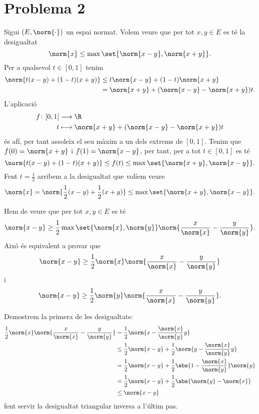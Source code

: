 \documentclass[12pt]{article}
\begin{document}
\section*{Problema 2}
Sigui \( (E, \norm{\cdot}) \) un espai normat. Volem veure que per tot \( x,y \in E \) es té
la desigualtat
\begin{equation*}
	\norm{x} \leq \max\set{\norm{x - y}, \norm{x + y}}.
\end{equation*}
Per a qualsevol \( t \in [0,1] \) tenim 
\begin{align*}
	\norm{t(x - y) + (1 - t)(x + y)} & \leq t\norm{x - y} + (1 - t)\norm{x + y} \\
																	 & = \norm{x+y} +	(\norm{x-y} - \norm{x+y})t.
\end{align*}
L'aplicació
\begin{align*}
	f \colon [0,1] & \longrightarrow \R \\
	t & \longmapsto \norm{x+y} + (\norm{x-y} - \norm{x+y})t
\end{align*}
és afí, per tant assoleix el seu màxim a un dels extrems de \( [0,1] \). Tenim que \( f(0) =
\norm{x+y} \) i \( f(1) = \norm{x -y} \), per tant, per a tot \( t \in [0,1] \) es té
\begin{equation*}
	\norm{t(x - y) + (1 - t)(x + y)} \leq f(t) \leq \max\set{\norm{x+y}, \norm{x-y}}.
\end{equation*}
Fent \( t = \frac{1}{2} \) arribem a la desigualtat que volíem veure
\begin{equation*}
	\norm{x} = \norm{\frac{1}{2}(x-y) + \frac{1}{2}(x+y)} \leq \max\set{\norm{x+y},
	\norm{x-y}}.
\end{equation*}

\parbreak

Hem de veure que per tot \( x,y \in E \) es té
\begin{equation*}
	\norm{x - y} \geq \frac{1}{2} \max\set{\norm{x}, \norm{y}} \norm{\frac{x}{\norm{x}} -
	\frac{y}{\norm{y}}}.
\end{equation*}
Aixó és equivalent a provar que 
\begin{equation*}
	\norm{x - y} \geq \frac{1}{2} \norm{x} \norm{\frac{x}{\norm{x}} -
	\frac{y}{\norm{y}}}
\end{equation*}
i 
\begin{equation*}
	\norm{x - y} \geq \frac{1}{2} \norm{y} \norm{\frac{x}{\norm{x}} -
	\frac{y}{\norm{y}}}.
\end{equation*}

Demostrem la primera de les desigualtats:
\begin{align*}
	\frac{1}{2} \norm{x} \norm{\frac{x}{\norm{x}} -	\frac{y}{\norm{y}}} 
	& = \frac{1}{2}\norm{x - \frac{\norm{x}}{\norm{y}}y} \\
	& \leq \frac{1}{2}\norm{x - y} + \frac{1}{2}\norm{y - \frac{\norm{x}}{\norm{y}}y} \\
	& = \frac{1}{2}\norm{x - y} + \frac{1}{2}\abs{1 - \frac{\norm{x}}{\norm{y}}}\norm{y} \\
	& = \frac{1}{2}\norm{x - y} + \frac{1}{2}\abs{\norm{y} - \norm{x}} \\
	& \leq \norm{x - y}
\end{align*}
fent servir la desigualtat triangular inversa a l'últim pas.
\end{document}
